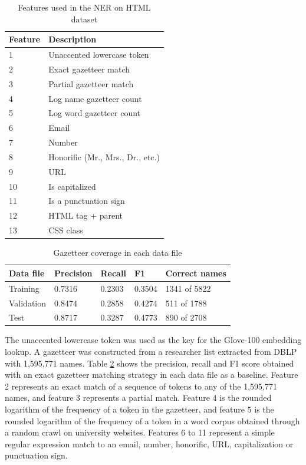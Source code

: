 \documentclass{nle}
\begin{document}
\begin{table}[h]
  \small
  \begin{center}
    \begin{tabular}{ ll }
      \toprule
      Feature & Description \\
      \midrule
      1  & Unaccented lowercase token \\
      2  & Exact gazetteer match \\
      3  & Partial gazetteer match \\
      4  & Log name gazetteer count\\
      5  & Log word gazetteer count\\
      6  & Email \\
      7  & Number \\
      8  & Honorific (Mr., Mrs., Dr., etc.)\\
      9  & URL \\
      10 & Is capitalized \\
      11 & Is a punctuation sign \\
      12 & HTML tag + parent \\
      13 & CSS class \\
      \bottomrule
    \end{tabular}
  \end{center}
  \caption{Features used in the NER on HTML dataset}
  \label{tab:features}
\end{table}

\begin{table}[h]
  \small
  \begin{center}
    \begin{tabular}{ lllll }
      \toprule
      Data file & Precision & Recall & F1 & Correct names \\
      \midrule
      Training   & 0.7316 & 0.2303 & 0.3504 & 1341 of 5822 \\ 
      Validation & 0.8474 & 0.2858 & 0.4274 & 511 of 1788 \\ 
      Test       & 0.8717 & 0.3287 & 0.4773 & 890 of 2708 \\ 
      \bottomrule
    \end{tabular}
  \end{center}
  \caption{Gazetteer coverage in each data file}
  \label{tab:gazetteer}
\end{table}

The unaccented lowercase token was used as the key for the Glove-100 embedding lookup.
A gazetteer was constructed from a researcher list extracted from DBLP with 1,595,771
names. Table \ref{tab:gazetteer} shows the precision, recall and F1 score obtained with an
exact gazetteer matching strategy in each data file as a baseline.
Feature 2 represents an exact match of a sequence of tokens to any of the 1,595,771 
names, and feature 3 represents a partial match. Feature 4 is the rounded logarithm of 
the frequency of a token in the gazetteer, and feature 5 is the rounded logarithm of the frequency
of a token in a word corpus obtained through a random crawl on university websites.
Features 6 to 11 represent a simple regular expression match to an email, number, 
honorific, URL, capitalization or punctuation sign.
\end{document}
